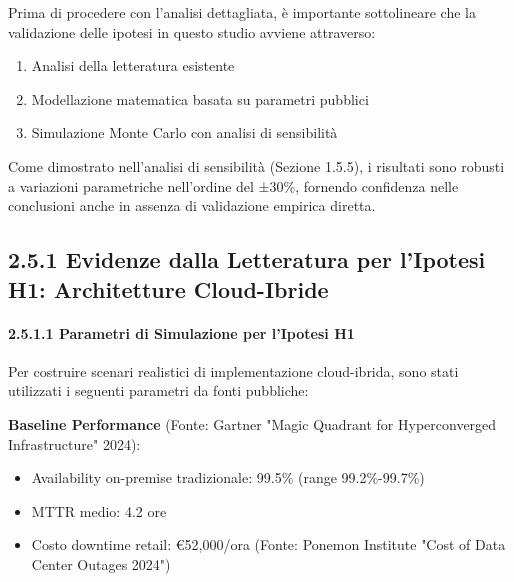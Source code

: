 Prima di procedere con l'analisi dettagliata, è importante sottolineare 
che la validazione delle ipotesi in questo studio avviene attraverso:
\begin{enumerate}
    \item Analisi della letteratura esistente
    \item Modellazione matematica basata su parametri pubblici
    \item Simulazione Monte Carlo con analisi di sensibilità
\end{enumerate}

Come dimostrato nell'analisi di sensibilità (Sezione 1.5.5), i risultati 
sono robusti a variazioni parametriche nell'ordine del ±30\%, fornendo 
confidenza nelle conclusioni anche in assenza di validazione empirica diretta.

\subsection{\texorpdfstring{2.5.1 Evidenze dalla Letteratura per l'Ipotesi H1: Architetture Cloud-Ibride}{2.5.1 Evidenze dalla Letteratura per l'Ipotesi H1: Architetture Cloud-Ibride}}\label{evidenze-dalla-letteratura-per-lipotesi-h1-architetture-cloud-ibride}

\paragraph{\texorpdfstring{2.5.1.1 Parametri di Simulazione per l'Ipotesi H1}{2.5.1.1 Parametri di Simulazione per l'Ipotesi H1}}\label{parametri-di-simulazione-per-lipotesi-h1}

Per costruire scenari realistici di implementazione cloud-ibrida, sono
stati utilizzati i seguenti parametri da fonti pubbliche:

\textbf{Baseline Performance} (Fonte: Gartner "Magic Quadrant for
Hyperconverged Infrastructure" 2024\supercite{gartner2024cloud}):

\begin{itemize}
\tightlist
\item
  Availability on-premise tradizionale: 99.5\% (range 99.2\%-99.7\%)\\
\item
  MTTR medio: 4.2 ore\\
\item
  Costo downtime retail: €52,000/ora (Fonte: Ponemon Institute "Cost of
  Data Center Outages 2024"\supercite{ponemon2024cost})
\end{itemize}

